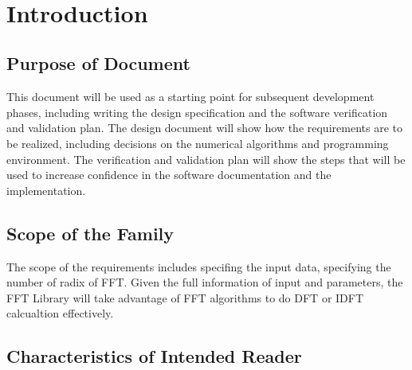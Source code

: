 \documentclass[12pt]{article}
\begin{document}

\newpage

\tableofcontents

~\newpage


\section{Introduction}



\subsection{Purpose of Document}

This document will be  used as a starting point for subsequent development phases, including writing the design specification and the software verification and validation plan.
The design document will show how the requirements are to be realized, including decisions on the numerical algorithms and programming environment.
The verification and validation plan will show the steps that will be used to increase confidence in the software documentation and the implementation.


\subsection{Scope of the Family} 

The scope of the requirements includes specifing the input data, specifying the number of radix of FFT. Given the full information of input and parameters, the FFT Library will
take advantage of FFT algorithms to do DFT or IDFT calcualtion effectively.


\subsection{Characteristics of Intended Reader} 
\end{document}
